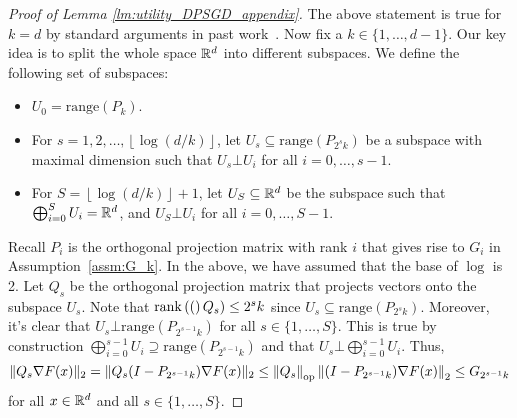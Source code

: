 \begin{proof}[Proof of Lemma \ref{lm:utility_DPSGD_appendix}]
The above statement is true for $k = d$ by standard arguments in past work~\cite{bassily2014private,song2021evading}.
Now fix a $k \in \{1, \dots, d - 1\}$.
Our key idea is to split the whole space $\mathbb{R}^d$ into different subspaces.
We define the following set of subspaces:
\begin{itemize}
\item $U_{0}=\text{range}(P_{k})$.
\item For $s=1,2,\ldots,\left\lfloor \log(d/k)\right\rfloor$, 
    let $U_{s} \subseteq \text{range}(P_{2^{s}k})$ be a subspace with maximal dimension such that $U_s \bot U_i$ for all $i=0, \dots, s-1$.
\item For $S=\left\lfloor \log(d/k)\right\rfloor +1$, 
    let $U_{S} \subseteq \mathbb{R}^{d}$ be the subspace such that $\bigoplus_{i=0}^S U_i = \mathbb{R}^d$, and $U_S \bot U_i$ for all $i=0, \dots, S-1$.
\end{itemize}
Recall $P_{i}$ is the orthogonal projection matrix with rank $i$ that gives rise to $G_{i}$ in Assumption~\ref{assm:G_k}. 
In the above, we have assumed that the base of $\log$ is 2.
Let $Q_{s}$ be the orthogonal projection matrix that projects vectors onto the subspace $U_{s}$. 
Note that $\mathrm{rank}\left((\right)Q_{s})\leq 2^{s}k$ since $U_s \subseteq \text{range}(P_{2^s k})$.
Moreover, it's clear that $U_s \bot \text{range}(P_{2^{s-1}k})$ for all $s \in \{1, \dots, S\}$. 
This is true by construction $\bigoplus_{i=0}^{s-1} U_i \supseteq \text{range}(P_{2^{s-1}k})$ and that 
$U_s \bot \bigoplus_{i=0}^{s-1} U_i$. Thus,
\begin{equation}
\label{eq:Qbound}
\|Q_{s}\nabla F(x)\|_{2} =
\|Q_{s} (I - P_{2^{s-1}k}) \nabla F(x)\|_{2}
\le 
\left\lVert Q_{s}\right\rVert_{\mathrm{op}} \left\lVert(I - P_{2^{s-1}k}) \nabla F(x)\right\rVert_2
\leq G_{2^{s-1}k}
\end{equation}
for all $x \in \mathbb{R}^d$ and all $s \in \{1, \dots, S\}$.


\end{proof}
